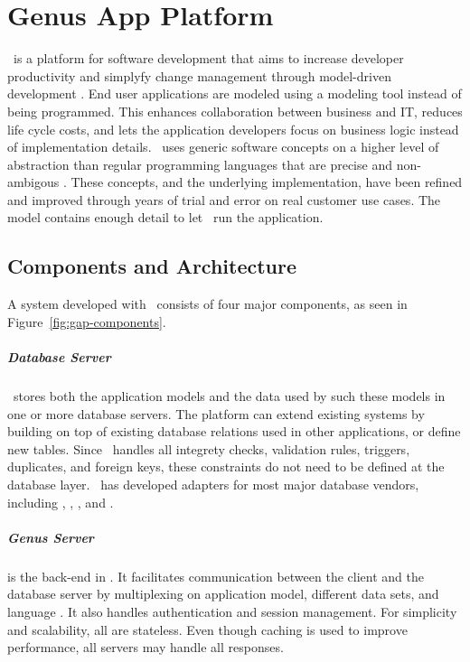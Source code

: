 \chapter{Genus App Platform}
\label{chap:Genus App Platform}

\gap~is a platform for software development that aims to increase developer productivity and simplyfy change management through model-driven development \cite{Genus_AS2016-kt}. End user applications are modeled using a modeling tool instead of being programmed. This enhances collaboration between business and IT, reduces life cycle costs, and lets the application developers focus on business logic instead of implementation details. \gap~uses generic software concepts on a higher level of abstraction than regular programming languages that are precise and non-ambigous \cite{noauthor_undated-qy}. These concepts, and the underlying implementation, have been refined and improved through years of trial and error on real customer use cases. The model contains enough detail to let \gap~run the application.


\section{Components and Architecture}
\label{sec:Components and Architecture}
A system developed with \gap~consists of four major components, as seen in Figure~\ref{fig:gap-components}.

\paragraph{Database Server}
\label{par:Database Server}
\gap~stores both the application models and the data used by such these models in one or more database servers. The platform can extend existing systems by building on top of existing database relations used in other applications, or define new tables. Since \gap~handles all integrety checks, validation rules, triggers, duplicates, and foreign keys, these constraints do not need to be defined at the database layer. \genus~has developed adapters for most major database vendors, including , , , and . 

\paragraph{Genus Server}
\label{par:Genus Server}
 is the back-end in \gap. It facilitates communication between the client and the database server by multiplexing on application model, different data sets, and language . It also handles authentication and session management. For simplicity and scalability, all  are stateless. Even though caching is used to improve performance, all servers may handle all responses. 

